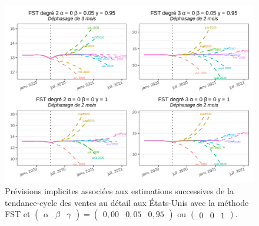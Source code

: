 \documentclass[
  12pt,
  a4paper,french]{article}
\newcommand\1{\mathds{1}}
\begin{document}
\begin{figure}

{\centering \includegraphics[width=0.9\linewidth]{img/nber/retailx_fstp2_implicit_forecast} 

}

\caption[Prévisions implicites associées aux estimations successives de la tendance-cycle des ventes au détail aux États-Unis avec la méthode FST et \(\begin{pmatrix}\alpha&\beta&\gamma\end{pmatrix} =\begin{pmatrix}0,00 &0,05&0,95\end{pmatrix}\) ou \(\begin{pmatrix}0 &0&1\end{pmatrix}\)]{Prévisions implicites associées aux estimations successives de la tendance-cycle des ventes au détail aux États-Unis avec la méthode FST et \(\begin{pmatrix}\alpha&\beta&\gamma\end{pmatrix} =\begin{pmatrix}0,00 &0,05&0,95\end{pmatrix}\) ou \(\begin{pmatrix}0 &0&1\end{pmatrix}\).}\label{fig:retailxipfst2}

\footnotesize
\normalsize\end{figure}

\newpage

\printbibliography[heading=bibintoc]
\end{document}
